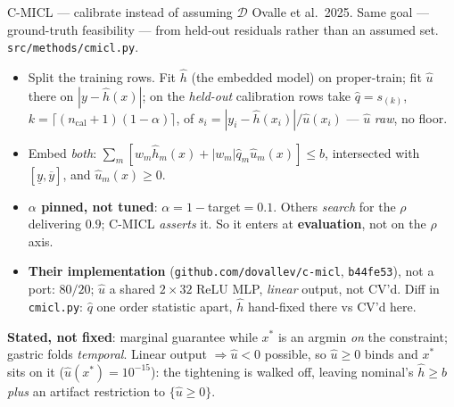\documentclass{beamer}
\begin{document}
\begin{frame}{C-MICL --- calibrate instead of assuming $\mathcal D$}
  \small
  Ovalle et al.\ 2025. Same goal --- ground-truth feasibility --- from held-out
  residuals rather than an assumed set. \texttt{src/methods/cmicl.py}.
  \begin{itemize}
    \item Split the training rows. Fit $\hat h$ (the embedded model) on
      proper-train; fit $\hat u$ there on $|y-\hat h(x)|$; on the \emph{held-out}
      calibration rows take $\hat q=s_{(k)}$,
      $k=\lceil(n_{\mathrm{cal}}{+}1)(1-\alpha)\rceil$, of
      $s_i=|y_i-\hat h(x_i)|/\hat u(x_i)$ --- $\hat u$ \emph{raw}, no floor.
    \item Embed \emph{both}:
      $\sum_m[w_m\hat h_m(x)+|w_m|\hat q_m\hat u_m(x)]\le b$, intersected with
      $[\underline y,\overline y]$, and $\hat u_m(x)\ge0$.
    \item \textbf{$\alpha$ pinned, not tuned}: $\alpha=1-$target$=0.1$. Others
      \emph{search} for the $\rho$ delivering $0.9$; C-MICL \emph{asserts} it. So
      it enters at \textbf{evaluation}, not on the $\rho$ axis.
    \item \textbf{Their implementation} (\texttt{github.com/dovallev/c-micl},
      \texttt{b44fe53}), not a port: $80/20$; $\hat u$ a shared $2\times32$ ReLU
      MLP, \emph{linear} output, not CV'd. Diff in \texttt{cmicl.py}: $\hat q$
      one order statistic apart, $\hat h$ hand-fixed there vs CV'd here.
  \end{itemize}
  \smallskip
  \textbf{Stated, not fixed}: marginal guarantee while $x^\ast$ is an argmin
  \emph{on} the constraint; gastric folds \emph{temporal}. Linear output
  $\Rightarrow\hat u<0$ possible, so $\hat u\ge0$ binds and $x^\ast$ sits on it
  ($\hat u(x^\ast)=10^{-15}$): the tightening is walked off, leaving nominal's
  $\hat h\ge b$ \emph{plus} an artifact restriction to $\{\hat u\ge0\}$.
\end{frame}
\end{document}
